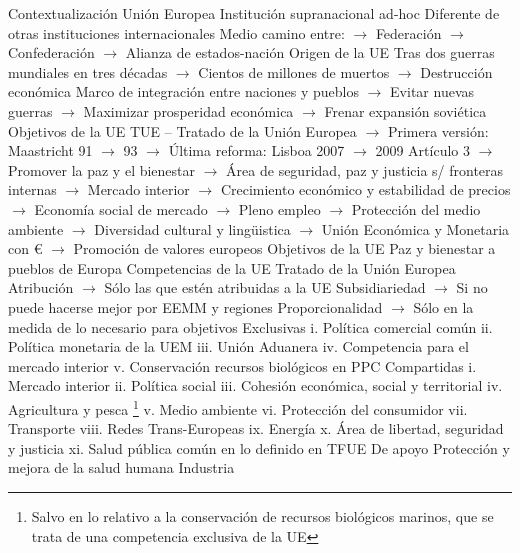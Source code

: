 \documentclass{nuevotema}
\begin{document}
\begin{esquemal}
	\1[] 
		\2 Contextualización
			\3 Unión Europea
				\4 Institución supranacional ad-hoc
				\4[] Diferente de otras instituciones internacionales
				\4[] Medio camino entre:
				\4[] $\to$ Federación
				\4[] $\to$ Confederación
				\4[] $\to$ Alianza de estados-nación
				\4 Origen de la UE
				\4[] Tras dos guerras mundiales en tres décadas
				\4[] $\to$ Cientos de millones de muertos
				\4[] $\to$ Destrucción económica
				\4[] Marco de integración entre naciones y pueblos
				\4[] $\to$ Evitar nuevas guerras
				\4[] $\to$ Maximizar prosperidad económica
				\4[] $\to$ Frenar expansión soviética
				\4 Objetivos de la UE
				\4[] TUE -- Tratado de la Unión Europea
				\4[] $\to$ Primera versión: Maastricht 91 $\to$ 93
				\4[] $\to$ Última reforma: Lisboa 2007 $\to$ 2009
				\4[] Artículo 3
				\4[] $\to$ Promover la paz y el bienestar
				\4[] $\to$ Área de seguridad, paz y justicia s/ fronteras internas
				\4[] $\to$ Mercado interior
				\4[] $\to$ Crecimiento económico y estabilidad de precios
				\4[] $\to$ Economía social de mercado
				\4[] $\to$ Pleno empleo
				\4[] $\to$ Protección del medio ambiente
				\4[] $\to$ Diversidad cultural y lingüistica
				\4[] $\to$ Unión Económica y Monetaria con €
				\4[] $\to$ Promoción de valores europeos
				\4[$\to$] Objetivos de la UE
				\4[] Paz y bienestar a pueblos de Europa
			\3 Competencias de la UE
				\4 Tratado de la Unión Europea
				\4[] Atribución
				\4[] $\to$ Sólo las que estén atribuidas a la UE
				\4[] Subsidiariedad
				\4[] $\to$ Si no puede hacerse mejor por EEMM y regiones
				\4[] Proporcionalidad
				\4[] $\to$ Sólo en la medida de lo necesario para objetivos
				\4 Exclusivas
				\4[] i. Política comercial común
				\4[] ii. Política monetaria de la UEM
				\4[] iii. Unión Aduanera
				\4[] iv. Competencia para el mercado interior
				\4[] v. Conservación recursos biológicos en PPC
				\4 Compartidas
				\4[] i. Mercado interior
				\4[] ii. Política social
				\4[] iii. Cohesión económica, social y territorial
				\4[] iv. Agricultura y pesca \footnote{Salvo en lo relativo a la conservación de recursos biológicos marinos, que se trata de una competencia exclusiva de la UE}
				\4[] v. Medio ambiente
				\4[] vi. Protección del consumidor
				\4[] vii. Transporte
				\4[] viii. Redes Trans-Europeas
				\4[] ix. Energía
				\4[] x. Área de libertad, seguridad y justicia
				\4[] xi. Salud pública común en lo definido en TFUE
				\4 De apoyo
				\4[] Protección y mejora de la salud humana
				\4[] Industria

\end{esquemal}
\end{document}
